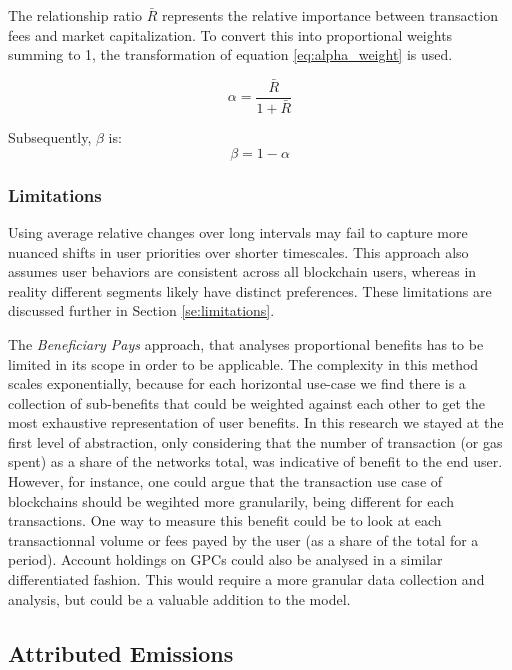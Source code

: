 \documentclass[11pt]{report}
\begin{document}
The relationship ratio $\bar{R}$ represents the relative importance between transaction fees and market capitalization. To convert this into proportional weights summing to 1, the transformation of equation \eqref{eq:alpha_weight} is used.

\begin{equation} \label{eq:alpha_weight}
    \alpha = \frac{\bar{R}}{1 + \bar{R}}
\end{equation}

Subsequently, \( \beta \) is:
\begin{equation} \label{eq:beta_weight}
    \beta = 1 - \alpha
\end{equation}


\subsubsection{Limitations}
Using average relative changes over long intervals may fail to capture more nuanced shifts in user priorities over shorter timescales. This approach also assumes user behaviors are consistent across all blockchain users, whereas in reality different segments likely have distinct preferences. These limitations are discussed further in Section \ref{se:limitations}.

The \textit{Beneficiary Pays} approach, that analyses proportional benefits has to be limited in its scope in order to be applicable. The complexity in this method scales exponentially, because for each horizontal use-case we find there is a collection of sub-benefits that could be weighted against each other to get the most exhaustive representation of user benefits. In this research we stayed at the first level of abstraction, only considering that the number of transaction (or gas spent) as a share of the networks total, was indicative of benefit to the end user. However, for instance, one could argue that the transaction use case of blockchains should be wegihted more granularily, being different for each transactions. One way to measure this benefit could be to look at each transactionnal volume or fees payed by the user (as a share of the total for a period). Account holdings on GPCs could also be analysed in a similar differentiated fashion. This would require a more granular data collection and analysis, but could be a valuable addition to the model.



\subsection{Attributed Emissions}
\end{document}
